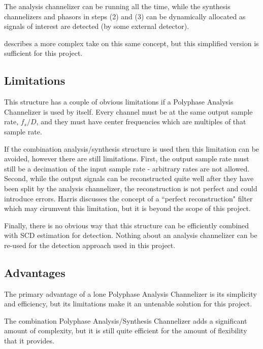 \documentclass[12pt]{report}
\begin{document}
The analysis channelizer can be running all the time, while the synthesis
channelizers and phasors in steps (2) and (3) can be dynamically allocated as
signals of interest are detected (by some external detector).

\cite{Harris2} describes a more complex take on this same concept, but this
simplified version is sufficient for this project.



\subsection{Limitations}
\label{sec:poly_limitations}
This structure has a couple of obvious limitations if a Polyphase Analysis
Channelizer is used by itself. Every channel must be at the same output sample
rate, $f_s/D$, and they must have center frequencies which are multiples of
that sample rate.

If the combination analysis/synthesis structure is used then this limitation
can be avoided, however there are still limitations. First, the output sample
rate must still be a decimation of the input sample rate - arbitrary rates are
not allowed. Second, while the output signals can be reconstructed quite well
after they have been split by the analysis channelizer, the reconstruction is
not perfect and could introduce errors. Harris discusses the concept of
a ``perfect reconstruction" filter \cite{Harris2} which may cirumvent this
limitation, but it is beyond the scope of this project.

Finally, there is no obvious way that this structure can be efficiently
combined with SCD estimation for detection. Nothing about an analysis
channelizer can be re-used for the detection approach used in this project.


\subsection{Advantages}
\label{sec:poly_advantages}
The primary advantage of a lone Polyphase Analysis Channelizer is its simplicity and efficiency, but its limitations make it an untenable solution for this project.

The combination Polyphase Analysis/Synthesis Channelizer adds a significant
amount of complexity, but it is still quite efficient for the amount of
flexibility that it provides.
\end{document}
